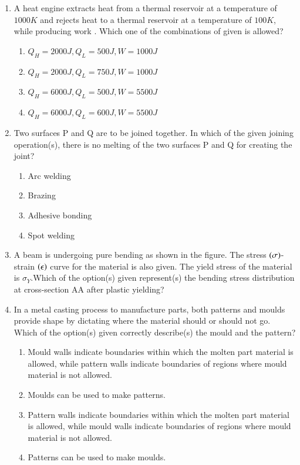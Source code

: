 \documentclass[journal]{IEEEtran}
\numberwithin{equation}{enumi}
\numberwithin{figure}{enumi}
\begin{document}
\begin{enumerate}
    \item 
    A heat engine extracts heat  from a thermal reservoir at a temperature of $1000 K$ and rejects heat  to a thermal reservoir at a temperature of $100 K$, while producing work . Which one of the combinations of  given is allowed?
    \begin{enumerate}
        \item $Q_H = 2000 J, Q_L = 500 J ,W = 1000 J$
        \item $Q_H = 2000 J, Q_L = 750 J,W = 1000 J$
        \item $Q_H = 6000 J, Q_L = 500 J ,W = 5500J$
        \item $Q_H = 6000 J, Q_L = 600 J ,W = 5500 J$
    \end{enumerate}

    \item 
    Two surfaces P and Q are to be joined together. In which of the given joining operation(s), there is no melting of the two surfaces P and Q for creating the joint?
    \begin{enumerate}
        \item Arc welding
        \item Brazing
        \item Adhesive bonding
        \item Spot welding
    \end{enumerate}

    \item
    A beam is undergoing pure bending as shown in the figure. The stress $\left(\sigma\right)$-strain $\left(\epsilon\right)$ curve for the material is also given. The yield stress of the material is $\sigma_Y$.Which of the option(s) given represent(s) the bending stress distribution at cross-section AA after plastic yielding?

    \item 
    In a metal casting process to manufacture parts, both patterns and moulds provide shape by dictating where the material should or should not go. Which of the option(s) given correctly describe(s) the mould and the pattern?

    \begin{enumerate}
        \item Mould walls indicate boundaries within which the molten part material is allowed, while pattern walls indicate boundaries of regions where mould material is not allowed.
        \item Moulds can be used to make patterns.
        \item Pattern walls indicate boundaries within which the molten part material is allowed, while mould walls indicate boundaries of regions where mould material is not allowed.
        \item Patterns can be used to make moulds.
    \end{enumerate}


\end{enumerate}
\end{document}
